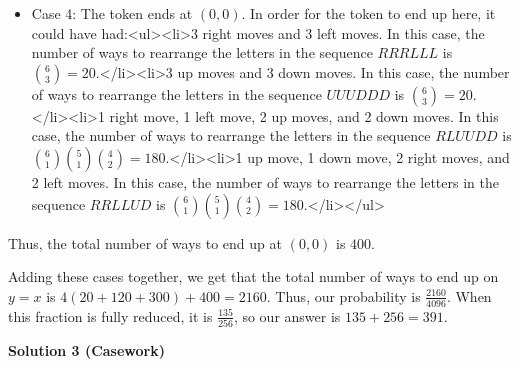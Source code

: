 \begin{enumerate}
 
            \begin{itemize}
        \item Case 4: The token ends at $(0,0)$. In order for the token to end up here, it could have had:<ul><li>3 right moves and 3 left moves. In this case, the number of ways to rearrange the letters in the sequence $RRRLLL$ is ${6\choose 3} = 20.$</li><li>3 up moves and 3 down moves. In this case, the number of ways to rearrange the letters in the sequence $UUUDDD$ is ${6\choose 3} = 20.$</li><li>1 right move, 1 left move, 2 up moves, and 2 down moves. In this case, the number of ways to rearrange the letters in the sequence $RLUUDD$ is ${6\choose 1}{5\choose 1}{4\choose 2} = 180.$</li><li>1 up move, 1 down move, 2 right moves, and 2 left moves. In this case, the number of ways to rearrange the letters in the sequence $RRLLUD$ is ${6\choose 1}{5\choose 1}{4\choose 2} = 180.$</li></ul>
            \end{itemize}
            Thus, the total number of ways to end up at $(0,0)$ is $400$.

 Adding these cases together, we get that the total number of ways to end up on $y = x$ is $4(20 + 120 + 300) + 400 = 2160$. Thus, our probability is $\frac{2160}{4096}$. When this fraction is fully reduced, it is $\frac{135}{256}$, so our answer is $135 + 256 = \boxed{391}.$




\textbf{Solution 3 (Casework)}


\end{enumerate}
